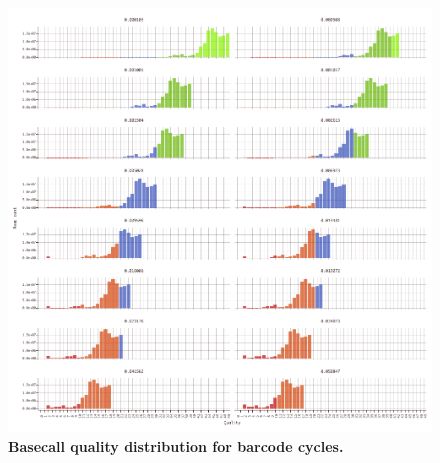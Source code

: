 \documentclass[10pt,twocolumn]{article}
\begin{document}
\begin{figure}[htbp]
\centering
\includegraphics[keepaspectratio,scale=1]{../plot/14_quality_distribution_by_rate_0550}
\caption{\footnotesize{\textbf{Basecall quality distribution for barcode cycles. } } }
\label{fig:14}
\end{figure}
\end{document}

